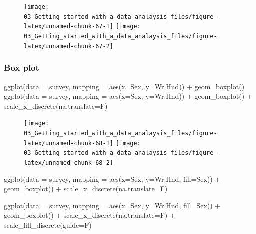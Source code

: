 \documentclass[
]{book}
\newenvironment{Shaded}{\begin{snugshade}}{\end{snugshade}}
\newcommand{\AttributeTok}[1]{\textcolor[rgb]{0.77,0.63,0.00}{#1}}
\newcommand{\FunctionTok}[1]{\textcolor[rgb]{0.00,0.00,0.00}{#1}}
\newcommand{\NormalTok}[1]{#1}
\newcommand{\SpecialCharTok}[1]{\textcolor[rgb]{0.00,0.00,0.00}{#1}}
\begin{document}
\begin{figure}
\texttt{[image: 03\_Getting\_started\_with\_a\_data\_analaysis\_files/figure-latex/unnamed-chunk-67-1]} \texttt{[image: 03\_Getting\_started\_with\_a\_data\_analaysis\_files/figure-latex/unnamed-chunk-67-2]} \end{figure}

\hypertarget{box-plot-1}{%
\subsubsection{Box plot}\label{box-plot-1}}

\begin{Shaded}
\begin{Highlighting}[]
\FunctionTok{ggplot}\NormalTok{(}\AttributeTok{data =}\NormalTok{ survey, }\AttributeTok{mapping =} \FunctionTok{aes}\NormalTok{(}\AttributeTok{x=}\NormalTok{Sex, }\AttributeTok{y=}\NormalTok{Wr.Hnd)) }\SpecialCharTok{+} 
  \FunctionTok{geom\_boxplot}\NormalTok{()}
\FunctionTok{ggplot}\NormalTok{(}\AttributeTok{data =}\NormalTok{ survey, }\AttributeTok{mapping =} \FunctionTok{aes}\NormalTok{(}\AttributeTok{x=}\NormalTok{Sex, }\AttributeTok{y=}\NormalTok{Wr.Hnd)) }\SpecialCharTok{+} 
  \FunctionTok{geom\_boxplot}\NormalTok{() }\SpecialCharTok{+} \FunctionTok{scale\_x\_discrete}\NormalTok{(}\AttributeTok{na.translate=}\NormalTok{F)}
\end{Highlighting}
\end{Shaded}

\begin{figure}
\texttt{[image: 03\_Getting\_started\_with\_a\_data\_analaysis\_files/figure-latex/unnamed-chunk-68-1]} \texttt{[image: 03\_Getting\_started\_with\_a\_data\_analaysis\_files/figure-latex/unnamed-chunk-68-2]} \end{figure}

\begin{Shaded}
\begin{Highlighting}[]
\FunctionTok{ggplot}\NormalTok{(}\AttributeTok{data =}\NormalTok{ survey, }\AttributeTok{mapping =} \FunctionTok{aes}\NormalTok{(}\AttributeTok{x=}\NormalTok{Sex, }\AttributeTok{y=}\NormalTok{Wr.Hnd, }\AttributeTok{fill=}\NormalTok{Sex)) }\SpecialCharTok{+} 
  \FunctionTok{geom\_boxplot}\NormalTok{() }\SpecialCharTok{+} \FunctionTok{scale\_x\_discrete}\NormalTok{(}\AttributeTok{na.translate=}\NormalTok{F) }

\FunctionTok{ggplot}\NormalTok{(}\AttributeTok{data =}\NormalTok{ survey, }\AttributeTok{mapping =} \FunctionTok{aes}\NormalTok{(}\AttributeTok{x=}\NormalTok{Sex, }\AttributeTok{y=}\NormalTok{Wr.Hnd, }\AttributeTok{fill=}\NormalTok{Sex)) }\SpecialCharTok{+} 
  \FunctionTok{geom\_boxplot}\NormalTok{() }\SpecialCharTok{+} \FunctionTok{scale\_x\_discrete}\NormalTok{(}\AttributeTok{na.translate=}\NormalTok{F) }\SpecialCharTok{+} 
  \FunctionTok{scale\_fill\_discrete}\NormalTok{(}\AttributeTok{guide=}\NormalTok{F) }
\end{Highlighting}
\end{Shaded}
\end{document}
